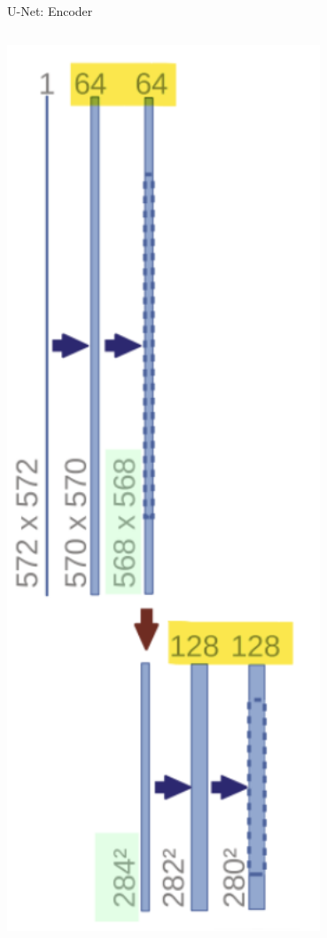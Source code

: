 \documentclass[serif, aspectratio=169]{beamer}
\begin{document}
\begin{frame}{U-Net: Encoder}
\begin{columns}[T]
        \begin{column}{0.2\textwidth}
            \begin{center}
                \includegraphics[width=0.7\textwidth]{pic/Unet-Encoder3.png}
                \vspace{3cm}
            \end{center}
        \end{column}
        
    \end{columns}
\end{frame}
\end{document}
